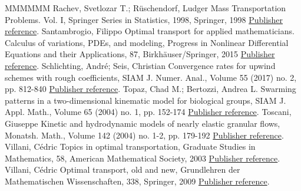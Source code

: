 \documentclass[11pt]{article}
\theoremstyle{definition}
\numberwithin{equation}{section}
\begin{document}
\begin{thebibliography}{MMMMMM}
 Rachev, Svetlozar T.; Rüschendorf, Ludger Mass Transportation Problems. Vol. I, Springer Series in Statistics, 1998, Springer, 1998 \href{https://ahl.centre-mersenne.org/item/AHL_2020__3__217_0/#rachev}{Publisher reference}.
 Santambrogio, Filippo Optimal transport for applied mathematicians. Calculus of variations, PDEs, and modeling, Progress in Nonlinear Differential Equations and their Applications, 87, Birkhäuser/Springer, 2015 \href{https://ahl.centre-mersenne.org/item/AHL_2020__3__217_0/#Filippoctouo}{Publisher reference}.
 Schlichting, André; Seis, Christian Convergence rates for upwind schemes with rough coefficients, SIAM J. Numer. Anal., Volume 55 (2017) no. 2, pp. 812-840 \href{https://ahl.centre-mersenne.org/item/AHL_2020__3__217_0/#schlichting}{Publisher reference}.
 Topaz, Chad M.; Bertozzi, Andrea L. Swarming patterns in a two-dimensional kinematic model for biological groups, SIAM J. Appl. Math., Volume 65 (2004) no. 1, pp. 152-174 \href{https://ahl.centre-mersenne.org/item/AHL_2020__3__217_0/#topaz}{Publisher reference}.
 Toscani, Giuseppe Kinetic and hydrodynamic models of nearly elastic granular flows, Monatsh. Math., Volume 142 (2004) no. 1-2, pp. 179-192 \href{https://ahl.centre-mersenne.org/item/AHL_2020__3__217_0/#Toscani}{Publisher reference}.
 Villani, Cédric Topics in optimal transportation, Graduate Studies in Mathematics, 58, American Mathematical Society, 2003 \href{https://ahl.centre-mersenne.org/item/AHL_2020__3__217_0/#Villani2}{Publisher reference}.
 Villani, Cédric Optimal transport, old and new, Grundlehren der Mathematischen Wissenschaften, 338, Springer, 2009 \href{https://ahl.centre-mersenne.org/item/AHL_2020__3__217_0/#Villani1}{Publisher reference}.
\end{thebibliography}
\end{document}
